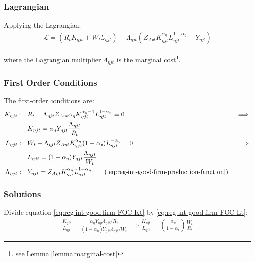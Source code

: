 \documentclass[
	thesis.tex
	]{subfiles}
\begin{document}

\subsubsection*{Lagrangian}

Applying the Lagrangian:
\begin{align}
	\label{eq:reg-int-good-firm-lagrangian}
	\mathcal{L} = (R_t K_{\eta jt} + W_t L_{\eta jt}) - \Lambda_{\eta jt} (Z_{A\eta t} K_{\eta jt}^{\alpha_\eta} L_{\eta jt}^{1-{\alpha_\eta}} - Y_{\eta jt})
\end{align}

where the Lagrangian multiplier $\Lambda_{\eta jt}$ is the marginal cost\footnote{see Lemma \ref{lemma:marginal-cost}}.

\subsubsection*{First Order Conditions}

The first-order conditions are:
\begin{alignat}{2}
	K_{\eta jt}: \quad & R_t - \Lambda_{\eta jt} Z_{A\eta t} {\alpha_\eta} K_{\eta jt}^{{\alpha_\eta}-1} L_{\eta jt}^{1-{\alpha_\eta}} = 0 &&\implies \nonumber \\
	& K_{\eta jt} = {\alpha_\eta} Y_{\eta jt} \frac{\Lambda_{\eta jt}}{R_t} \label{eq:reg-int-good-firm-FOC-Kt} \\
	L_{\eta jt}: \quad & W_t - \Lambda_{\eta jt} Z_{A\eta t} K_{\eta jt}^{\alpha_\eta} (1-{\alpha_\eta}) L_{\eta jt}^{-{\alpha_\eta}} = 0 \quad &&\implies \nonumber \\ 
	& L_{\eta jt} = (1-{\alpha_\eta}) Y_{\eta jt} \frac{\Lambda_{\eta jt}}{W_t} \label{eq:reg-int-good-firm-FOC-Lt} \\
	\Lambda_{\eta jt}: \quad & Y_{\eta jt} = Z_{A\eta t} K_{\eta jt}^{\alpha_\eta} L_{\eta jt}^{1-{\alpha_\eta}} \tag{\ref{eq:reg-int-good-firm-production-function}}
\end{alignat}

\subsubsection*{Solutions}

Divide equation \ref{eq:reg-int-good-firm-FOC-Kt} by \ref{eq:reg-int-good-firm-FOC-Lt}:
\begin{align}
	\frac{K_{\eta jt}}{L_{\eta jt}} = \frac{{\alpha_\eta} Y_{\eta jt} \Lambda_{\eta jt} /R_t}{(1-{\alpha_\eta}) Y_{\eta jt} \Lambda_{\eta jt} /W_t} \implies
	\frac{K_{\eta jt}}{L_{\eta jt}} = \left( \frac{{\alpha_\eta}}{1-{\alpha_\eta}} \right) \frac{W_t}{R_t} \label{eq:reg-int-good-firm-TMRS}
\end{align}
\end{document}
